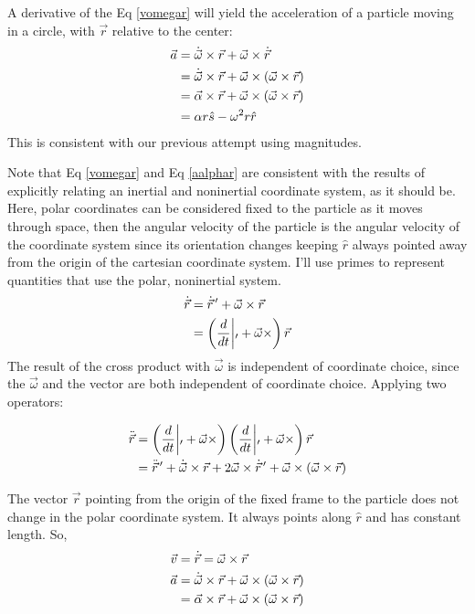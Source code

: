 \documentclass[10pt]{article}
\begin{document}
A derivative of the Eq \ref{vomegar} 
will yield the acceleration of a particle moving 
in a circle, with $\vec{r}$ relative to the center:
\begin{align}
    \vec{a} & = \dot{\vec{\omega}}\times\vec{r} + 
        \vec{\omega}\times\dot{\vec{r}} \notag\\
    &= \dot{\vec{\omega}}\times\vec{r} + 
        \vec{\omega}\times(\vec{\omega}\times\vec{r}) \notag\\
    &= \vec{\alpha}\times\vec{r} + 
        \vec{\omega}\times(\vec{\omega}\times\vec{r}) \label{aalphar} \\
    &= \alpha r\hat{s} - \omega^2 r\hat{r}
\end{align}
This is consistent with our previous attempt using magnitudes.

Note that Eq \ref{vomegar} and Eq \ref{aalphar}
are consistent with the results of explicitly relating an inertial 
and noninertial coordinate system, as it should be. 
Here, polar coordinates can be considered fixed to the 
particle as it moves through space, then the angular velocity of the 
particle is the angular velocity of the coordinate system since its orientation
changes keeping $\hat{r}$ always pointed away from the origin of the 
cartesian coordinate system.
I'll use primes to represent quantities that use the polar, noninertial system.
\begin{align}
    \dot{\vec{r}} &= \dot{\vec{r}}^{\,\prime} 
        + \vec{\omega}\times\vec{r}  \notag\\
        &= \left(\frac{d}{dt}\middle|_\prime + \vec{\omega}\times\right)\vec{r}
\end{align}
The result of the 
cross product with $\vec{\omega}$ is independent of coordinate choice, 
since the $\vec{\omega}$ and the vector are both 
independent of coordinate choice.
Applying two operators:

\begin{align}
    \ddot{\vec{r}}
        &= \left(\frac{d}{dt}\middle|_\prime + \vec{\omega}\times\right)
        \left(\frac{d}{dt}\middle|_\prime + \vec{\omega}\times\right)\vec{r} 
        \notag\\
    &= \ddot{\vec{r}}^{\,\prime} + \dot{\vec{\omega}}\times\vec{r} + 
        2\vec{\omega}\times\dot{\vec{r}}^{\,\prime} + 
        \vec{\omega}\times(\vec{\omega}\times\vec{r})
\end{align}

The vector $\vec{r}$ pointing from the origin 
of the fixed frame to the particle does not change in the polar coordinate 
system. It always points along $\hat{r}$ and has constant length. So,
\begin{align}
    \vec{v}&=\dot{\vec{r}} = \vec{\omega}\times\vec{r} \\
    \vec{a}&=\dot{\vec{\omega}}\times\vec{r} + 
        \vec{\omega}\times(\vec{\omega}\times\vec{r}) \notag\\
        &= \vec{\alpha}\times\vec{r} + 
        \vec{\omega}\times(\vec{\omega}\times\vec{r})
\end{align}
\end{document}

